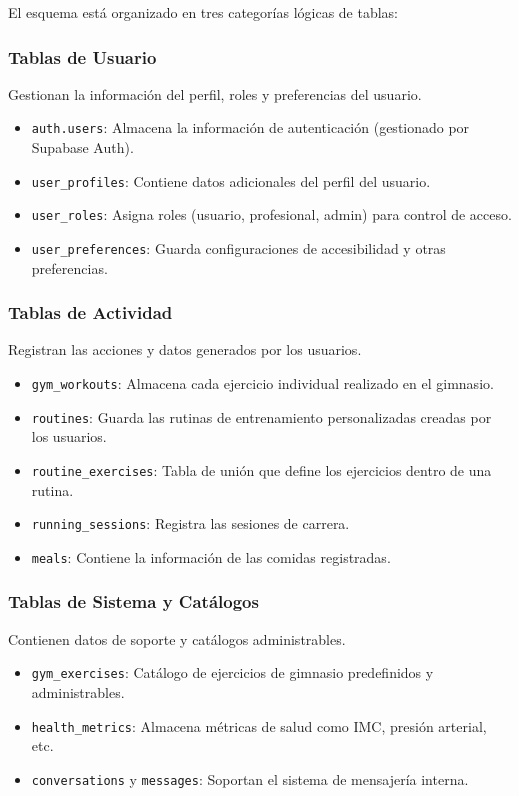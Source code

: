 \documentclass[12pt,a4paper]{article}
\begin{document}
El esquema está organizado en tres categorías lógicas de tablas:

\subsubsection{Tablas de Usuario}
Gestionan la información del perfil, roles y preferencias del usuario.
\begin{itemize}
    \item \texttt{auth.users}: Almacena la información de autenticación (gestionado por Supabase Auth).
    \item \texttt{user\_profiles}: Contiene datos adicionales del perfil del usuario.
    \item \texttt{user\_roles}: Asigna roles (usuario, profesional, admin) para control de acceso.
    \item \texttt{user\_preferences}: Guarda configuraciones de accesibilidad y otras preferencias.
\end{itemize}

\subsubsection{Tablas de Actividad}
Registran las acciones y datos generados por los usuarios.
\begin{itemize}
    \item \texttt{gym\_workouts}: Almacena cada ejercicio individual realizado en el gimnasio.
    \item \texttt{routines}: Guarda las rutinas de entrenamiento personalizadas creadas por los usuarios.
    \item \texttt{routine\_exercises}: Tabla de unión que define los ejercicios dentro de una rutina.
    \item \texttt{running\_sessions}: Registra las sesiones de carrera.
    \item \texttt{meals}: Contiene la información de las comidas registradas.
\end{itemize}

\subsubsection{Tablas de Sistema y Catálogos}
Contienen datos de soporte y catálogos administrables.
\begin{itemize}
    \item \texttt{gym\_exercises}: Catálogo de ejercicios de gimnasio predefinidos y administrables.
    \item \texttt{health\_metrics}: Almacena métricas de salud como IMC, presión arterial, etc.
    \item \texttt{conversations} y \texttt{messages}: Soportan el sistema de mensajería interna.
\end{itemize}
\end{document}
